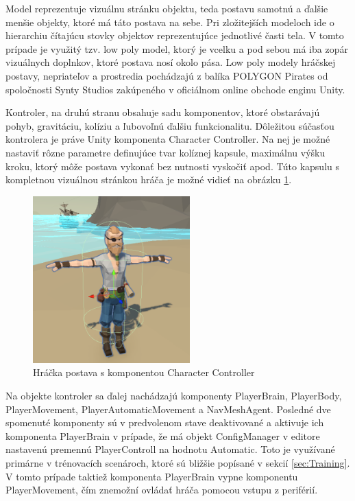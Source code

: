 \documentclass[slovak, master]{diploma}
\begin{document}
Model reprezentuje vizuálnu stránku objektu, teda postavu samotnú a ďalšie menšie objekty, ktoré má táto postava na sebe. Pri zložitejších modeloch ide o hierarchiu čítajúcu stovky objektov reprezentujúce jednotlivé časti tela. V tomto prípade je využitý tzv. low poly model, ktorý je vcelku a pod sebou má iba zopár vizuálnych doplnkov, ktoré postava nosí okolo pása. Low poly modely hráčskej postavy, nepriateľov a prostredia pochádzajú z balíka POLYGON Pirates \cite{Synty} od spoločnosti Synty Studios zakúpeného v oficiálnom online obchode enginu Unity.

Kontroler, na druhú stranu obsahuje sadu komponentov, ktoré obstarávajú pohyb, gravitáciu, kolíziu a ľubovoľnú ďalšiu funkcionalitu. Dôležitou súčasťou kontrolera je práve Unity komponenta Character Controller. Na nej je možné nastaviť rôzne parametre definujúce tvar kolíznej kapsule, maximálnu výšku kroku, ktorý môže postava vykonať bez nutnosti vyskočiť apod. Túto kapsulu s kompletnou vizuálnou stránkou hráča je možné vidieť na obrázku \ref{pic:PlayerController}.

\begin{figure}[!htbp]
	\centering
	\includegraphics[width=0.54\textwidth]{Figures/controller.png}
	\caption{Hráčka postava s komponentou Character Controller}
	\label{pic:PlayerController}
\end{figure}

Na objekte kontroler sa ďalej nachádzajú komponenty PlayerBrain, PlayerBody, PlayerMovement, PlayerAutomaticMovement a NavMeshAgent. Posledné dve spomenuté komponenty sú v predvolenom stave deaktivované a aktivuje ich komponenta PlayerBrain v prípade, že má objekt ConfigManager v editore nastavenú premennú PlayerControll na hodnotu Automatic. Toto je využívané primárne v trénovacích scenároch, ktoré sú bližšie popísané v sekcií \ref{sec:Training}. V tomto prípade taktiež komponenta PlayerBrain vypne komponentu PlayerMovement, čím znemožní ovládať hráča pomocou vstupu z periférií. 
\end{document}
